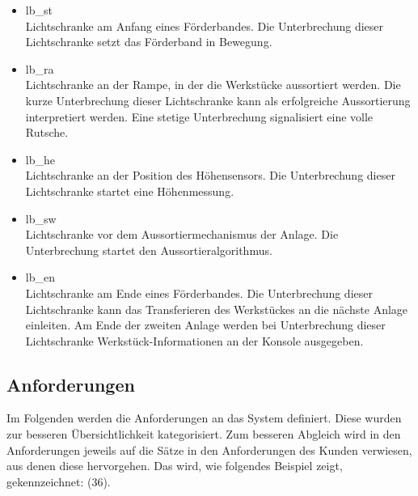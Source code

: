 \begin{itemize}
\begin{itemize}
        \item \gls{lb_st}\\
        Lichtschranke am Anfang eines Förderbandes.
        Die Unterbrechung dieser Lichtschranke setzt das Förderband in Bewegung.
        \item \gls{lb_ra}\\
        Lichtschranke an der Rampe, in der die Werkstücke aussortiert werden.
        Die kurze Unterbrechung dieser Lichtschranke kann als erfolgreiche Aussortierung interpretiert werden.
        Eine stetige Unterbrechung signalisiert eine volle Rutsche.
        \item \gls{lb_he}\\
        Lichtschranke an der Position des Höhensensors.
        Die Unterbrechung dieser Lichtschranke startet eine Höhenmessung.
        \item \gls{lb_sw}\\
        Lichtschranke vor dem Aussortiermechanismus der Anlage.
        Die Unterbrechung startet den Aussortieralgorithmus.
        \item \gls{lb_en}\\
        Lichtschranke am Ende eines Förderbandes.
        Die Unterbrechung dieser Lichtschranke kann das Transferieren des Werkstückes an die nächste Anlage einleiten.
        Am Ende der zweiten Anlage werden bei Unterbrechung dieser Lichtschranke Werkstück-Informationen an der Konsole ausgegeben.
    \end{itemize}
\end{itemize}

\subsection{Anforderungen}\label{subsec:anforderungen2}
Im Folgenden werden die Anforderungen an das System definiert. Diese wurden zur besseren
Übersichtlichkeit kategorisiert. Zum besseren Abgleich wird in den
Anforderungen jeweils auf die Sätze in den Anforderungen des Kunden verwiesen, aus denen diese hervorgehen.
Das wird, wie folgendes Beispiel zeigt, gekennzeichnet: (36). 


\FloatBarrier


